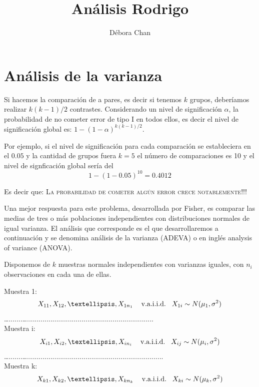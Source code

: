 \documentclass[a4paper,12pt]{article}
\title{Análisis Rodrigo}
\author{D\'ebora Chan}
\date{}
\begin{document}
\section{Análisis de la varianza}

\begin{center}
\end{center}


Si hacemos la comparación de a pares, es decir si tenemos $k$ grupos, deberíamos realizar $k(k-1)/2$ contrastes. Considerando un nivel de significación $\alpha$, la probabilidad de no cometer error de tipo I en todos ellos, es decir el nivel de significación global es: $1-(1-\alpha)^{k(k-1)/2}$.

Por ejemplo, si el nivel de significación para cada comparación se estableciera  en el  $0.05$ y la cantidad de grupos fuera $k=5$  el número de comparaciones es 10 y el nivel de signficación global sería del $$1-(1-0.05)^{10} = 0.4012$$

Es decir que:
\textcolor{BlueGreen}{\textsc{ La probabilidad de cometer algún error crece notablemente!!!}}

Una mejor respuesta para este problema, desarrollada por Fisher, es comparar las medias de tres o más poblaciones independientes con distribuciones normales de igual varianza. El análisis que corresponde es el que desarrollaremos a continuación y se denomina análisis de la varianza (ADEVA) o en inglés analysis of variance (ANOVA).

Disponemos de $k$ muestras 
	normales independientes con varianzas iguales, con $n_i$ observaciones en cada una de ellas.
	
	Muestra 1: \textcolor{BlueGreen}{ $$ X_{11}, X_{12},…, X_{1n_1} \hspace{0.3cm} \text{ v.a.i.i.d.}      \hspace{0.3cm} X_{1i}\sim  N(\mu_1, \sigma^2)$$}
	….......….................................................................\\
	Muestra i:   \textcolor{BlueGreen}{ $$ X_{i1}, X_{i2},…, X_{in_i}\hspace{0.3cm} \text{ v.a.i.i.d.}      \hspace{0.3cm} X_{ij}\sim  N(\mu_i, \sigma^2)$$}
	….......…......................................................................\\
	Muestra k:  \textcolor{BlueGreen}{$$ X_{k1}, X_{k2},…, X_{kn_k}\hspace{0.3cm} \text{ v.a.i.i.d.}      \hspace{0.3cm} X_{ki}\sim  N(\mu_k, \sigma^2)$$}
\end{document}
